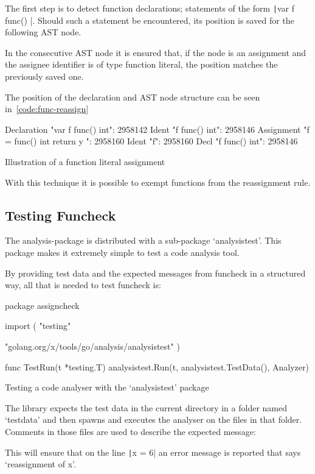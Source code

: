 The first step is to detect function declarations; statements of the form
\texttt|var f func() |. Should such a statement be encountered,
its position is saved for the following AST node.

In the consecutive AST node it is ensured that, if the node is an assignment and
the assignee identifier is of type function literal, the position matches the
previously saved one.

The position of the declaration and AST node structure can be seen in~\ref{code:func-reassign}

\begin{listing}
    \begin{gocode}
Declaration "var f func() int": 2958142
        Ident "f func() int": 2958146
Assignment "f = func() int { return y }": 2958160
        Ident "f": 2958160
                Decl "f func() int": 2958146
\end{gocode}
	\caption{Illustration of a function literal assignment\autocite{ast-positions}\label{code:func-reassign}}
\end{listing}

With this technique it is possible to exempt functions from the reassignment rule.

\subsection{Testing Funcheck}

The analysis-package is distributed with a sub-package `analysistest'. This package makes
it extremely simple to test a code analysis tool.

By providing test data and the expected messages from funcheck in a structured way, all
that is needed to test funcheck is:

\begin{code}
\begin{gocode}
package assigncheck

import (
        "testing"

        "golang.org/x/tools/go/analysis/analysistest"
)

func TestRun(t *testing.T) {
        analysistest.Run(t, analysistest.TestData(), Analyzer)
}
\end{gocode}
    \caption{Testing a code analyser with the `analysistest' package}
\end{code}

The library expects the test data in the current directory in a folder named `testdata' and
then spawns and executes the analyser on the files in that folder. Comments in those files
are used to describe the expected message:


This will ensure that on the line \texttt|x = 6| an error message is reported that says
`reassignment of x'.
